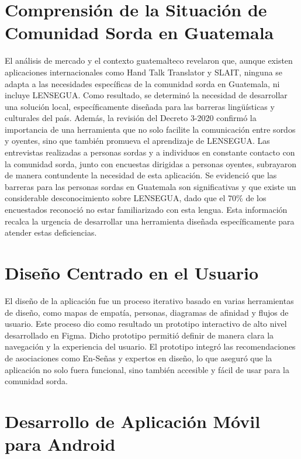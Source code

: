     \section{Comprensión de la Situación de Comunidad Sorda en Guatemala}
    
    El análisis de mercado y el contexto guatemalteco revelaron que, aunque existen aplicaciones internacionales como Hand Talk Translator y SLAIT, ninguna se adapta a las necesidades específicas de la comunidad sorda en Guatemala, ni incluye LENSEGUA. Como resultado, se determinó la necesidad de desarrollar una solución local, específicamente diseñada para las barreras lingüísticas y culturales del país. Además, la revisión del Decreto 3-2020 confirmó la importancia de una herramienta que no solo facilite la comunicación entre sordos y oyentes, sino que también promueva el aprendizaje de LENSEGUA. Las entrevistas realizadas a personas sordas y a individuos en constante contacto con la comunidad sorda, junto con encuestas dirigidas a personas oyentes, subrayaron de manera contundente la necesidad de esta aplicación. Se evidenció que las barreras para las personas sordas en Guatemala son significativas y que existe un considerable desconocimiento sobre LENSEGUA, dado que el 70\% de los encuestados reconoció no estar familiarizado con esta lengua. Esta información recalca la urgencia de desarrollar una herramienta diseñada específicamente para atender estas deficiencias.
    
    \section{Diseño Centrado en el Usuario}
    
    El diseño de la aplicación fue un proceso iterativo basado en varias herramientas de diseño, como mapas de empatía, personas, diagramas de afinidad y flujos de usuario. Este proceso dio como resultado un prototipo interactivo de alto nivel desarrollado en Figma. Dicho prototipo permitió definir de manera clara la navegación y la experiencia del usuario. El prototipo integró las recomendaciones de asociaciones como En-Señas y expertos en diseño, lo que aseguró que la aplicación no solo fuera funcional, sino también accesible y fácil de usar para la comunidad sorda. 

    
    \section{Desarrollo de Aplicación Móvil para Android}
    
